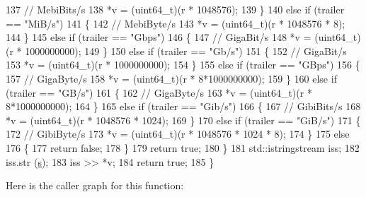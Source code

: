 \begin{DoxyCode}
137           \textcolor{comment}{// MebiBits/s}
138           *v = (uint64\_t)(r * 1048576);
139         \}
140       \textcolor{keywordflow}{else} \textcolor{keywordflow}{if} (trailer == \textcolor{stringliteral}{"MiB/s"})
141         \{
142           \textcolor{comment}{// MebiByte/s}
143           *v = (uint64\_t)(r * 1048576 * 8);
144         \}
145       \textcolor{keywordflow}{else} \textcolor{keywordflow}{if} (trailer == \textcolor{stringliteral}{"Gbps"})
146         \{
147           \textcolor{comment}{// GigaBit/s}
148           *v = (uint64\_t)(r * 1000000000);
149         \}
150       \textcolor{keywordflow}{else} \textcolor{keywordflow}{if} (trailer == \textcolor{stringliteral}{"Gb/s"})
151         \{
152           \textcolor{comment}{// GigaBit/s}
153           *v = (uint64\_t)(r * 1000000000);
154         \}
155       \textcolor{keywordflow}{else} \textcolor{keywordflow}{if} (trailer == \textcolor{stringliteral}{"GBps"})
156         \{
157           \textcolor{comment}{// GigaByte/s}
158           *v = (uint64\_t)(r * 8*1000000000);
159         \}
160       \textcolor{keywordflow}{else} \textcolor{keywordflow}{if} (trailer == \textcolor{stringliteral}{"GB/s"})
161         \{
162           \textcolor{comment}{// GigaByte/s}
163           *v = (uint64\_t)(r * 8*1000000000);
164         \}
165       \textcolor{keywordflow}{else} \textcolor{keywordflow}{if} (trailer == \textcolor{stringliteral}{"Gib/s"})
166         \{
167           \textcolor{comment}{// GibiBits/s}
168           *v = (uint64\_t)(r * 1048576 * 1024);
169         \}
170       \textcolor{keywordflow}{else} \textcolor{keywordflow}{if} (trailer == \textcolor{stringliteral}{"GiB/s"})
171         \{
172           \textcolor{comment}{// GibiByte/s}
173           *v = (uint64\_t)(r * 1048576 * 1024 * 8);
174         \}
175       \textcolor{keywordflow}{else}
176         \{
177           \textcolor{keywordflow}{return} \textcolor{keyword}{false};
178         \}
179       \textcolor{keywordflow}{return} \textcolor{keyword}{true};
180     \}
181   std::istringstream iss;
182   iss.str (\hyperlink{generate__test__data__lte__sinr_8m_ad83eeb3a142285d1243a08c6b7026df8}{s});
183   iss >> *v;
184   \textcolor{keywordflow}{return} \textcolor{keyword}{true};
185 \}
\end{DoxyCode}


Here is the caller graph for this function\+:


